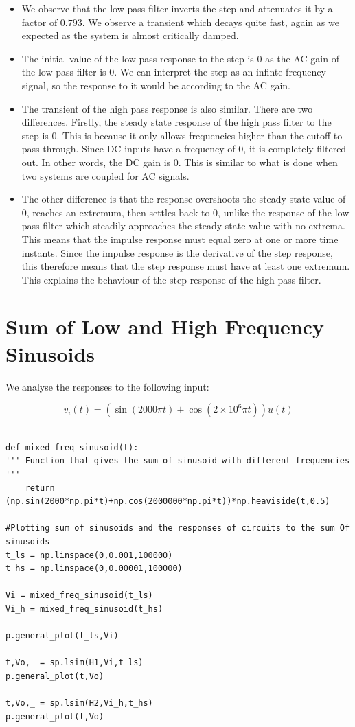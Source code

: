 \documentclass{article}
\begin{document}
\begin{itemize}
    \item
      We observe that the low pass filter inverts the step and attenuates it
      by a factor of \(0.793\). We
      observe a transient which decays quite fast, again as we expected as
      the system is almost critically damped.
    \item
      The initial value of the low pass response to the step is \(0\) as the
      AC gain of the low pass filter is \(0\). We can interpret the step as
      an infinte frequency signal, so the response to it would be according
      to the AC gain.
    \item
      The transient of the high pass response is also similar. There are two
      differences. Firstly, the steady state response of the high pass
      filter to the step is \(0\). This is because it only allows
      frequencies higher than the cutoff to pass through. Since DC inputs
      have a frequency of \(0\), it is completely filtered out. In other
      words, the DC gain is \(0\). This is similar to what is done when two
      systems are coupled for AC signals. 
    \item
      The other difference is that the response overshoots the steady state
      value of \(0\), reaches an extremum, then settles back to \(0\),
      unlike the response of the low pass filter which steadily approaches
      the steady state value with no extrema. This means that
      the impulse response must equal zero at one or more time instants.
      Since the impulse response is the derivative of the step response,
      this therefore means that the step response must have at least one
      extremum. This explains the behaviour of the step response of the high
      pass filter.
\end{itemize}

\section*{Sum of Low and High Frequency Sinusoids}

We analyse the responses to the following input:

\[v_i(t) = (\sin(2000 \pi t) + \cos(2 \times 10^6 \pi t))u(t)\]

\begin{lstlisting}

def mixed_freq_sinusoid(t):
''' Function that gives the sum of sinusoid with different frequencies '''
    return (np.sin(2000*np.pi*t)+np.cos(2000000*np.pi*t))*np.heaviside(t,0.5)
 
#Plotting sum of sinusoids and the responses of circuits to the sum Of sinusoids
t_ls = np.linspace(0,0.001,100000)
t_hs = np.linspace(0,0.00001,100000)

Vi = mixed_freq_sinusoid(t_ls)
Vi_h = mixed_freq_sinusoid(t_hs)

p.general_plot(t_ls,Vi)

t,Vo,_ = sp.lsim(H1,Vi,t_ls)
p.general_plot(t,Vo)

t,Vo,_ = sp.lsim(H2,Vi_h,t_hs)
p.general_plot(t,Vo)

\end{lstlisting}
\end{document}

